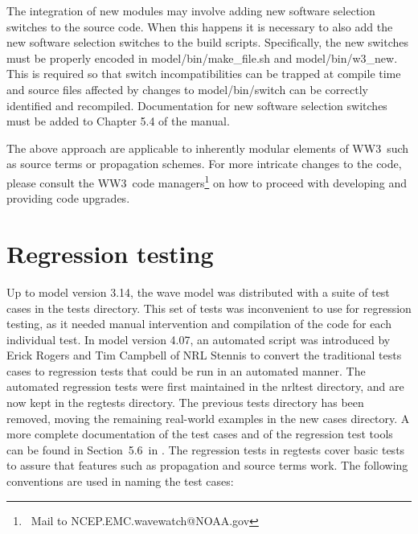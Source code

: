 \documentclass[12pt]{article}
\newcommand{\manref}{ww3man2016}
\newcommand{\manregtestsec}{5.6}
\newcommand{\ws}{WW3}
\newcommand{\file}{\sf}
\newcommand{\pb}{\strut \vfill \pagebreak}
\newcommand{\newsec}{\setcounter{equation}{0}
                      \setcounter{myfigno}{0}
                      \setcounter{mytabno}{0}}
\newcounter{myfigno}[section]
\newcounter{mytabno}[section]
\begin{document}
\vspace{\baselineskip} \noindent The integration of new modules may involve
adding new software selection switches to the source code. When this happens
it is necessary to also add the new software selection switches to the build
scripts.  Specifically, the new switches must be properly encoded in {\file
  model/bin/make\_file.sh} and {\file model/bin/w3\_new}. This is required so
that switch incompatibilities can be trapped at compile time and source files
affected by changes to {\file model/bin/switch} can be correctly identified
and recompiled. Documentation for new software selection switches must be
added to Chapter 5.4 of the manual.

\vspace{\baselineskip} \noindent The above approach are applicable to
inherently modular elements of \ws\ such as source terms or propagation
schemes. For more intricate changes to the code, please consult the \ws\ code
managers\footnote{~Mail to NCEP.EMC.wavewatch@NOAA.gov} on how to proceed with
developing and providing code upgrades.


\pb
\section{Regression testing} \label{sec:testing}
\newsec

Up to model version 3.14, the wave model was distributed with a suite of test
cases in the {\file tests} directory. This set of tests was inconvenient to
use for regression testing, as it needed manual intervention and compilation
of the code for each individual test. In model version 4.07, an automated
script was introduced by Erick Rogers and Tim Campbell of NRL Stennis to
convert the traditional tests cases to regression tests that could be run in
an automated manner. The automated regression tests were first maintained in
the {\file nrltest} directory, and are now kept in the {\file regtests}
directory.  The previous {\file tests} directory has been removed, moving the
remaining real-world examples in the new {\file cases} directory. A more
complete documentation of the test cases and of the regression test tools can
be found in Section~\manregtestsec\ in \cite{\manref}.  The regression tests
in {\file regtests} cover basic tests to assure that features such as
propagation and source terms work. The following conventions are used in
naming the test cases:
\end{document}

